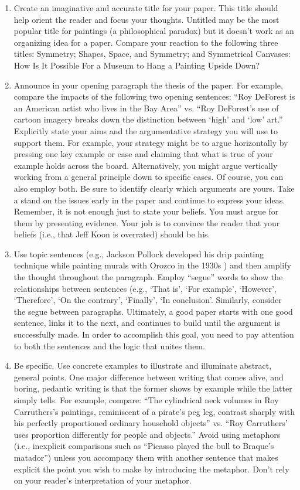 \begin{multicols}{2}
\begin{enumerate}
\item  Create an imaginative and accurate title for your paper. This title should help orient the reader and focus your thoughts. Untitled may be the most popular title for paintings (a philosophical paradox) but it doesn’t work as an organizing idea for a paper. Compare your reaction to the following three titles: Symmetry; Shapes, Space, and Symmetry; and Symmetrical Canvases: How Is It Possible For a Museum to Hang a Painting Upside Down?
\item  Announce in your opening paragraph the thesis of the paper. For example, compare the impacts of the following two opening sentences: “Roy DeForest is an American artist who lives in the Bay Area” vs. “Roy DeForest’s use of cartoon imagery breaks down the distinction between ‘high’ and ‘low’ art.” Explicitly state your aims and the argumentative strategy you will use to support them. For example, your strategy might be to argue horizontally by pressing one key example or case and claiming that what is true of your example holds across the board. Alternatively, you might argue vertically working from a general principle down to specific cases. Of course, you can also employ both. Be sure to identify clearly which arguments are yours. Take a stand on the issues early in the paper and continue to express your ideas. Remember, it is not enough just to state your beliefs. You must argue for them by presenting evidence. Your job is to convince the reader that your beliefs (i.e., that Jeff Koon is overrated) should be his.
\item  Use topic sentences (e.g., Jackson Pollock developed his drip painting technique while painting murals with Orozco in the 1930s ) and then amplify the thought throughout the paragraph. Employ “segue” words to show the relationships between sentences (e.g., ‘That is’, ‘For example’, ‘However’, ‘Therefore’, ‘On the contrary’, ‘Finally’, ‘In conclusion’. Similarly, consider the segue between paragraphs. Ultimately, a good paper starts with one good sentence, links it to the next, and continues to build until the argument is successfully made. In order to accomplish this goal, you need to pay attention to both the sentences and the logic that unites them.
\item    Be specific. Use concrete examples to illustrate and illuminate abstract, general points. One major difference between writing that comes alive, and boring, pedantic writing is that the former shows by example while the latter simply tells. For example, compare: “The cylindrical neck volumes in Roy Carruthers’s paintings, reminiscent of a pirate’s peg leg, contrast sharply with his perfectly proportioned ordinary household objects” vs. “Roy Carruthers’ uses proportion differently for people and objects.” Avoid using metaphors (i.e., inexplicit comparisons such as “Picasso played the bull to Braque’s matador”) unless you accompany them with another sentence that makes explicit the point you wish to make by introducing the metaphor. Don’t rely on your reader’s interpretation of your metaphor.

\end{enumerate}
\end{multicols}
